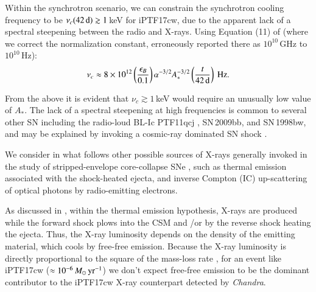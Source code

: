 \documentclass[twocolumn]{emulateapj}
\begin{document}
Within the synchrotron scenario, we can constrain the synchrotron cooling frequency to be $\nu_c(42\,{\rm d})\gtrsim 1$\,keV for iPTF17cw, due to the apparent lack of a spectral steepening between the radio and X-rays. Using Equation (11) of \citet{Chevalier2006} (where we correct the normalization constant, erroneously reported there as $10^{10}$\,GHz to $10^{10}$\,Hz):
\begin{equation}
\nu_{c}  \approx8\times10^{12}\left(\frac{\epsilon_B}{0.1}\right)\alpha^{-3/2}A_*^{-3/2}\left(\frac{t}{\rm 42\,d}\right)~{\rm Hz}.
\end{equation}

From the above it is evident that $\nu_c\gtrsim 1$\,keV would require an unusually low value of $A_*$. The lack of a spectral steepening at high frequencies is common to several other SN including the radio-loud BL-Ic PTF11qcj \citep{Corsi2014}, SN\,2009bb, and SN\,1998bw, and may be explained by invoking a cosmic-ray dominated SN shock \citep{Ellison2000,Chevalier2006}. 

We consider in what follows other possible sources of X-rays generally invoked in the study of stripped-envelope core-collapse SNe \citep{Chevalier2006}, such as thermal emission associated with the shock-heated ejecta, and  inverse Compton (IC) up-scattering of optical photons by radio-emitting electrons. 

As discussed in \citet{Corsi2014}, within the thermal emission hypothesis, X-rays are produced while  the  forward  shock  plows  into  the  CSM  and /or  by  the reverse  shock  heating  the  ejecta.  Thus,  the  X-ray  luminosity depends  on  the  density  of  the  emitting  material,  which  cools by free-free emission. Because the X-ray luminosity is directly proportional to the square of the mass-loss rate \citep[see e.g. Eq. (16) in][]{Corsi2014}, for an event like iPTF17cw ($\approx 10^{-6}\,M_{\odot}\,{\rm yr}^{-1}$) we don't expect free-free emission to be the dominant contributor to the iPTF17cw X-ray counterpart detected by \textit{Chandra}.
\end{document}
